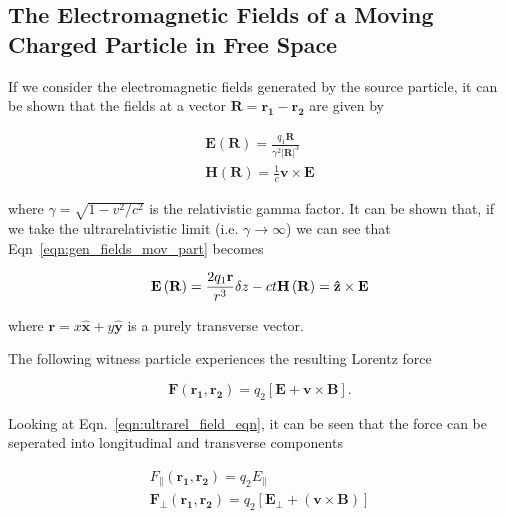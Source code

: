 \subsection{The Electromagnetic Fields of a Moving Charged Particle in Free Space}

If we consider the electromagnetic fields generated by the source particle, it can be shown that the fields at a vector $\mathbf{R} = \mathbf{r_{1}} - \mathbf{r_{2}}$ are given by

\begin{align}
\mathbf{E}\left( \mathbf{R}  \right) = \frac{q_{1}\mathbf{R}}{\gamma^{2}\left| \mathbf{R} \right|^{3}} \\
\mathbf{H}\left( \mathbf{R}  \right) = \frac{1}{c}\mathbf{v} \times \mathbf{E}
\label{eqn:gen_fields_mov_part}
\end{align}

where $\gamma = \sqrt{1- v^{2}/c^{2}}$ is the relativistic gamma factor. It can be shown that, if we take the ultrarelativistic limit (i.e. $\gamma \rightarrow \infty$) we can see that Eqn~\ref{eqn:gen_fields_mov_part} becomes

\begin{equation}
\mathbf{E}\left( \mathbf{R}  \right) = \frac{2q_{1}\mathbf{r}}{r^{3}}\delta{z-ct} \\
\mathbf{H}\left( \mathbf{R}  \right) = \mathbf{\hat{z}} \times \mathbf{E}
\label{eqn:ultrarel_field_eqn}
\end{equation}

where $\mathbf{r} = x\mathbf{\hat{x}} + y\mathbf{\hat{y}}$ is a purely transverse vector.

The following witness particle experiences the resulting Lorentz force 

\begin{equation}
\mathbf{F}\left(\mathbf{r_{1}}, \mathbf{r_{2}}  \right) = q_{2}\left[ \mathbf{E} + \mathbf{v} \times \mathbf{B}  \right]. 
\end{equation}

Looking at Eqn.~\ref{eqn:ultrarel_field_eqn}, it can be seen that the force can be seperated into longitudinal and transverse components 

\begin{align}
F_{\parallel}\left(\mathbf{r_{1}}, \mathbf{r_{2}}  \right) = q_{2}E_{\parallel} \\
\mathbf{F_{\perp}}\left(\mathbf{r_{1}}, \mathbf{r_{2}}  \right)  = q_{2}\left[ \mathbf{E_{\perp}} + \left( \mathbf{v} \times \mathbf{B} \right) \right]
\end{align}

